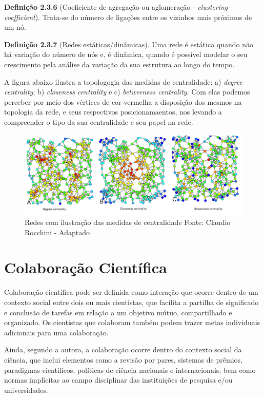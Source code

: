 \documentclass[12pt]{article}
\begin{document}
\noindent \textbf{Definição 2.3.6} (Coeficiente de agregação ou aglomeração - \textit{clustering coefficient}). Trata-se do número de ligações entre os vizinhos mais próximos de um nó.

\noindent \textbf{Definição 2.3.7} (Redes estáticas/dinâmicas). Uma rede é estática quando não há variação do número de nós e, é dinâmica, quando é possível modelar o seu crescimento pela análise da variação da sua estrutura ao longo do tempo.

A figura abaixo ilustra a topologogia das medidas de centralidade: a) \textit{degree centrality}; b) \textit{closeness centrality} e c) \textit{betweeness centrality}. Com elas podemos perceber por meio dos vértices de cor vermelha a disposição dos mesmos na topologia da rede, e seus respectivos posicionamaentos, nos levando a compreender o tipo da sua centralidade e seu papel na rede.

\begin{figure}[H]
\centering
\includegraphics[scale=0.5]{images/Centrality.pdf}
\caption{Redes com ilustração das medidas de centralidade
Fonte: Claudio Rocchini - Adaptado}
\label{centrality}
\end{figure}

\section{Colaboração Científica}

Colaboração científica pode ser definida como interação que ocorre dentro de um contexto social entre dois ou mais cientistas, que facilita a partilha de significado e conclusão de tarefas em relação a um objetivo mútuo, compartilhado e organizado. Os cientistas que colaboram também podem trazer metas individuais adicionais para uma colaboração. \cite{Sonnenwald}

Ainda, segundo a autora, a colaboração ocorre dentro do contexto social da ciência, que inclui elementos como a revisão por pares, sistemas de prêmios, paradigmas científicos, políticas de ciência nacionais e internacionais, bem como normas implícitas ao campo disciplinar das instituições de pesquisa e/ou universidades. 
\end{document}
